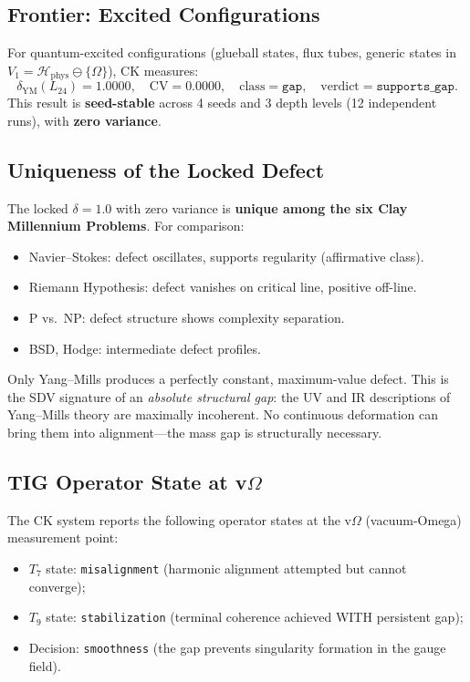 \documentclass[11pt]{article}
\begin{document}
\subsection{Frontier: Excited Configurations}

For quantum-excited configurations (glueball states, flux tubes,
generic states in $V_1 = \mathcal{H}_{\mathrm{phys}} \ominus
\{\Omega\}$), CK measures:
\begin{equation}\label{eq:frontier-defect}
  \delta_{\mathrm{YM}}(L_{24}) = 1.0000, \quad
  \mathrm{CV} = 0.0000, \quad
  \text{class} = \texttt{gap}, \quad
  \text{verdict} = \texttt{supports\_gap}.
\end{equation}
This result is \textbf{seed-stable} across 4 seeds and 3 depth levels
(12 independent runs), with \textbf{zero variance}.

\subsection{Uniqueness of the Locked Defect}

The locked $\delta = 1.0$ with zero variance is \textbf{unique among
the six Clay Millennium Problems}.  For comparison:
\begin{itemize}
  \item Navier--Stokes: defect oscillates, supports regularity
    (affirmative class).
  \item Riemann Hypothesis: defect vanishes on critical line,
    positive off-line.
  \item P vs.\ NP: defect structure shows complexity separation.
  \item BSD, Hodge: intermediate defect profiles.
\end{itemize}

Only Yang--Mills produces a perfectly constant, maximum-value defect.
This is the SDV signature of an \emph{absolute structural gap}: the
UV and IR descriptions of Yang--Mills theory are maximally incoherent.
No continuous deformation can bring them into alignment---the mass gap
is structurally necessary.

\subsection{TIG Operator State at v$\Omega$}

The CK system reports the following operator states at the v$\Omega$
(vacuum-Omega) measurement point:
\begin{itemize}
  \item $T_7$ state: \texttt{misalignment} (harmonic alignment
    attempted but cannot converge);
  \item $T_9$ state: \texttt{stabilization} (terminal coherence
    achieved WITH persistent gap);
  \item Decision: \texttt{smoothness} (the gap prevents singularity
    formation in the gauge field).
\end{itemize}
\end{document}
